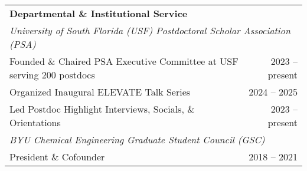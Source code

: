 \documentclass[letterpaper,11pt]{article}
\begin{document}
\begin{longtable}{@{}p{}r@{}}
  \multicolumn{2}{l}{\hspace{-3mm} \bf{Departmental \& Institutional Service}}                                                                                                                                                                                                                  \\ [4pt]
  \multicolumn{2}{l}{\hspace{1mm} \textit{University of South Florida (USF) Postdoctoral Scholar Association (PSA)}}                                                                                                                                                                            \\ [3pt]
  \hspace{7mm} Founded \& Chaired PSA Executive Committee at USF serving 200 postdocs                                                                                                                             & 2023 -- present                                                             \\ [3pt]
  \hspace{7mm} Organized Inaugural ELEVATE Talk Series                                                                                                                                                            & 2024 -- 2025                                                                \\ [3pt]
  \hspace{7mm} Led Postdoc Highlight Interviews, Socials, \& Orientations                                                                                                                                         & 2023 -- present                                                             \\ [4pt]
  \multicolumn{2}{l}{\hspace{1mm} \textit{BYU Chemical Engineering Graduate Student Council (GSC)}}                                                                                                                                                                                             \\ [3pt]
  \hspace{7mm} President \& Cofounder                                                                                                                                                                             & 2018 -- 2021                                                                \\ [3pt]

\end{longtable}
\end{document}
